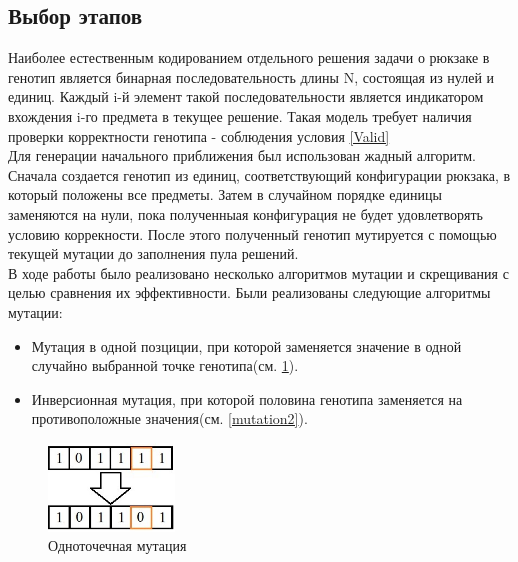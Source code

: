 \subsection{Выбор этапов}%
Наиболее естественным кодированием отдельного решения задачи о рюкзаке в генотип является бинарная последовательность длины N, состоящая из нулей и единиц.
Каждый i-й элемент такой последовательности является индикатором вхождения i-го предмета в текущее решение. Такая модель требует наличия проверки корректности генотипа - соблюдения условия \ref{Valid} 
\\ Для генерации начального приближения был использован жадный алгоритм. Сначала создается генотип из единиц, соответствующий конфигурации рюкзака, в который положены все предметы. Затем в случайном порядке единицы заменяются на нули, пока полученныая конфигурация не будет удовлетворять условию коррекности. После этого полученный генотип мутируется с помощью текущей мутации до заполнения пула решений.
\\ В ходе работы было реализовано несколько алгоритмов мутации и скрещивания с целью сравнения их эффективности. Были реализованы следующие алгоритмы мутации:
\begin{itemize}
	\item Мутация в одной позциции, при которой заменяется значение в одной случайно выбранной точке генотипа(см. \ref{mutation1}).
	\item Инверсионная мутация, при которой половина генотипа заменяется на противоположные значения(см. \ref{mutation2}).
\end{itemize}
\FloatBarrier
	\begin{figure}[htbp]	
	\includegraphics[width=0.3\textwidth]{./Pics/1.jpg}
	\caption{Одноточечная мутация}
	\label{mutation1}
	\end{figure}	

